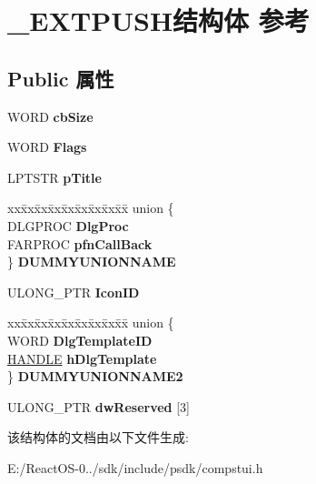 \hypertarget{struct___e_x_t_p_u_s_h}{}\section{\+\_\+\+E\+X\+T\+P\+U\+S\+H结构体 参考}
\label{struct___e_x_t_p_u_s_h}
\subsection*{Public 属性}
\begin{DoxyCompactItemize}
\item 
\mbox{\label{struct___e_x_t_p_u_s_h_ad0116ee9354eb4d19727502451abe8f4}} 
W\+O\+RD {\bfseries cb\+Size}
\item 
\mbox{\label{struct___e_x_t_p_u_s_h_ae7e800d043f0f6de4f19877d4e1fd571}} 
W\+O\+RD {\bfseries Flags}
\item 
\mbox{\label{struct___e_x_t_p_u_s_h_ab0d2fcf1d1c86e836b746c36ed694f79}} 
L\+P\+T\+S\+TR {\bfseries p\+Title}
\item 
\mbox{\label{struct___e_x_t_p_u_s_h_a833dcc0c943a256c68e51705aa37ba3f}} 
\begin{tabbing}
xx\=xx\=xx\=xx\=xx\=xx\=xx\=xx\=xx\=\kill
union \{\\
\>DLGPROC {\bfseries DlgProc}\\
\>FARPROC {\bfseries pfnCallBack}\\
\} {\bfseries DUMMYUNIONNAME}\\

\end{tabbing}\item 
\mbox{\label{struct___e_x_t_p_u_s_h_a589747497df1ea07cdb62ba5722c4ed4}} 
U\+L\+O\+N\+G\+\_\+\+P\+TR {\bfseries Icon\+ID}
\item 
\mbox{\label{struct___e_x_t_p_u_s_h_a5148dab90860b797bda6eb1ec539a22e}} 
\begin{tabbing}
xx\=xx\=xx\=xx\=xx\=xx\=xx\=xx\=xx\=\kill
union \{\\
\>WORD {\bfseries DlgTemplateID}\\
\>\hyperlink{interfacevoid}{HANDLE} {\bfseries hDlgTemplate}\\
\} {\bfseries DUMMYUNIONNAME2}\\

\end{tabbing}\item 
\mbox{\label{struct___e_x_t_p_u_s_h_a2e9cd1552b20577bf265396085041ba1}} 
U\+L\+O\+N\+G\+\_\+\+P\+TR {\bfseries dw\+Reserved} \mbox{[}3\mbox{]}
\end{DoxyCompactItemize}


该结构体的文档由以下文件生成\+:\begin{DoxyCompactItemize}
\item 
E\+:/\+React\+O\+S-\/0../sdk/include/psdk/compstui.\+h\end{DoxyCompactItemize}
